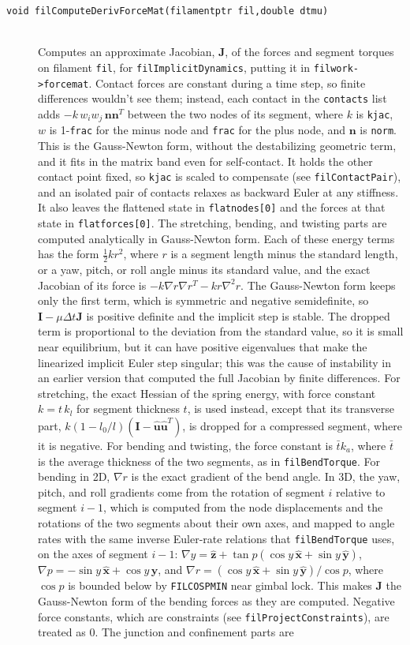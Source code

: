 \documentclass {scrbook}
\newcommand {\ttt} {\texttt}
\begin{document}
\begin{description}
\item[\ttt{void filComputeDerivForceMat(filamentptr fil,double dtmu)}] %
\hfill \\
Computes an approximate Jacobian, $\bm{J}$, of the forces and segment torques on filament \ttt{fil}, for \ttt{filImplicitDynamics}, putting it in \ttt{filwork->forcemat}. Contact forces are constant during a time step, so finite differences wouldn't see them; instead, each contact in the \ttt{contacts} list adds $-k\,w_iw_j\,\bm{n}\bm{n}^T$ between the two nodes of its segment, where $k$ is \ttt{kjac}, $w$ is 1-\ttt{frac} for the minus node and \ttt{frac} for the plus node, and $\bm{n}$ is \ttt{norm}. This is the Gauss-Newton form, without the destabilizing geometric term, and it fits in the matrix band even for self-contact. It holds the other contact point fixed, so \ttt{kjac} is scaled to compensate (see \ttt{filContactPair}), and an isolated pair of contacts relaxes as backward Euler at any stiffness. It also leaves the flattened state in \ttt{flatnodes[0]} and the forces at that state in \ttt{flatforces[0]}. The stretching, bending, and twisting parts are computed analytically in Gauss-Newton form. Each of these energy terms has the form $\frac{1}{2}kr^2$, where $r$ is a segment length minus the standard length, or a yaw, pitch, or roll angle minus its standard value, and the exact Jacobian of its force is $-k\nabla r\nabla r^T-kr\nabla^2 r$. The Gauss-Newton form keeps only the first term, which is symmetric and negative semidefinite, so $\bm{I}-\mu\Delta t\bm{J}$ is positive definite and the implicit step is stable. The dropped term is proportional to the deviation from the standard value, so it is small near equilibrium, but it can have positive eigenvalues that make the linearized implicit Euler step singular; this was the cause of instability in an earlier version that computed the full Jacobian by finite differences. For stretching, the exact Hessian of the spring energy, with force constant $k=t\,k_l$ for segment thickness $t$, is used instead, except that its transverse part, $k(1-l_0/l)(\bm{I}-\hat{\bm{u}}\hat{\bm{u}}^T)$, is dropped for a compressed segment, where it is negative. For bending and twisting, the force constant is $\bar{t}k_a$, where $\bar{t}$ is the average thickness of the two segments, as in \ttt{filBendTorque}. For bending in 2D, $\nabla r$ is the exact gradient of the bend angle. In 3D, the yaw, pitch, and roll gradients come from the rotation of segment $i$ relative to segment $i-1$, which is computed from the node displacements and the rotations of the two segments about their own axes, and mapped to angle rates with the same inverse Euler-rate relations that \ttt{filBendTorque} uses, on the axes of segment $i-1$: $\nabla y=\hat{\bm{z}}+\tan p(\cos y\,\hat{\bm{x}}+\sin y\,\hat{\bm{y}})$, $\nabla p=-\sin y\,\hat{\bm{x}}+\cos y\,\hat{\bm{y}}$, and $\nabla r=(\cos y\,\hat{\bm{x}}+\sin y\,\hat{\bm{y}})/\cos p$, where $\cos p$ is bounded below by \ttt{FILCOSPMIN} near gimbal lock. This makes $\bm{J}$ the Gauss-Newton form of the bending forces as they are computed. Negative force constants, which are constraints (see \ttt{filProjectConstraints}), are treated as 0. The junction and confinement parts are 
\end{description}
\end{document}
